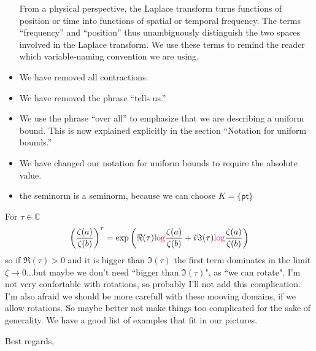 \documentclass{letter}
\begin{document}
\begin{letter}{}
\begin{itemize}
From a physical perspective, the Laplace transform turns functions of position or time into functions of spatial or temporal frequency. The terms ``frequency'' and ``position'' thus unambiguously distinguish the two spaces involved in the Laplace transform. We use these terms to remind the reader which variable-naming convention we are using.
\item We have removed all contractions.
\item We have removed the phrase ``tells us.''
\item We use the phrase ``over all'' to emphasize that we are describing a uniform bound. This is now explained explicitly in the section ``Notation for uniform bounds.''
\item We have changed our notation for uniform bounds to require the absolute value.
\item the seminorm is a seminorm, because we can choose $K=\{\mathsf{pt}\}$
\end{itemize}
\color{orange}
For $\tau\in\mathbb{C}$
\begin{equation}
    \left(\frac{\zeta(a)}{\zeta(b)}\right)^\tau=\exp\left(\Re(\tau) \textcolor{magenta}{\log} \frac{\zeta(a)}{\zeta(b)}+i\Im(\tau)\textcolor{magenta}{\log} \frac{\zeta(a)}{\zeta(b)}\right)
\end{equation}
so if $\Re(\tau)>0$ and it is bigger than $\Im(\tau)$ the first term dominates in the limit $\zeta\to0$...but maybe we don't need ``bigger than $\Im(\tau)$", as ``we can rotate". I'm not very confortable with rotations, so probably I'll not add this complication. I'm also afraid we should be more carefull with these mooving domains, if we allow rotations. So maybe better not make things too complicated for the sake of generality. We have a good list of examples that fit in our pictures. 
\color{black}
\color{black}
\closing{Best regards,}
\end{letter}
\end{document}
